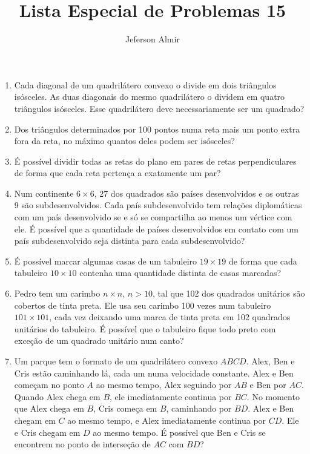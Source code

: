 \documentclass{article}
\title{Lista Especial de Problemas 15}
\author{Jeferson Almir}
\date{}
\begin{document}
\maketitle

\begin{enumerate}
    \item Cada diagonal de um quadrilátero convexo o divide em dois triângulos isósceles. As duas diagonais do mesmo quadrilátero o dividem em quatro triângulos isósceles. Esse quadrilátero deve necessariamente ser um quadrado?
    
    \item Dos triângulos determinados por 100 pontos numa reta mais um ponto extra fora da reta, no máximo quantos deles podem ser isósceles?
    
    \item É possível dividir todas as retas do plano em pares de retas perpendiculares de forma que cada reta pertença a exatamente um par?
    
    \item Num continente $6\times 6$, 27 dos quadrados são países desenvolvidos e os outras 9 são subdesenvolvidos. Cada país subdesenvolvido tem relações diplomáticas com um país desenvolvido se e só se compartilha ao menos um vértice com ele. É possível que a quantidade de países desenvolvidos em contato com um país subdesenvolvido seja distinta para cada subdesenvolvido?
    
    \item É possível marcar algumas casas de um tabuleiro $19\times19$ de forma que cada tabuleiro $10\times10$ contenha uma quantidade distinta de casas marcadas?
    
    \item Pedro tem um carimbo $n\times n$, $n>10$, tal que 102 dos quadrados unitários são cobertos de tinta preta. Ele usa seu carimbo 100 vezes num tabuleiro $101\times101$, cada vez deixando uma marca de tinta preta em 102 quadrados unitários do tabuleiro. É possível que o tabuleiro fique todo preto com exceção de um quadrado unitário num canto?
    
    \item Um parque tem o formato de um quadrilátero convexo $ABCD$. Alex, Ben e Cris estão caminhando lá, cada um numa velocidade constante. Alex e Ben começam no ponto $A$ ao mesmo tempo, Alex seguindo por $AB$ e Ben por $AC$. Quando Alex chega em $B$, ele imediatamente continua por $BC$. No momento que Alex chega em $B$, Cris começa em $B$, caminhando por $BD$. Alex e Ben chegam em $C$ ao mesmo tempo, e Alex imediatamente continua por $CD$. Ele e Cris chegam em $D$ ao mesmo tempo. É possível que Ben e Cris se encontrem no ponto de interseção de $AC$ com $BD$?
    

\end{enumerate}
\end{document}
